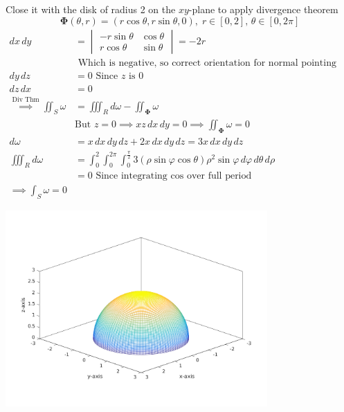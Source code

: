 \documentclass{article}
\begin{document}
\begin{enumerate}
\begin{enumerate}
        Close it with the disk of radius 2 on the $xy$-plane to apply divergence 
        theorem
        \[ \boldsymbol \Phi(\theta, r) = 
        (r \cos \theta, r \sin \theta, 0),\; 
        r \in [0,2],\, \theta \in [0, 2\pi] \]
        \begin{align*}
            dx\, dy &= 
            \begin{vmatrix} -r\sin \theta & \cos \theta \\ 
                             r \cos \theta &  \sin \theta 
            \end{vmatrix} = -2r \\
            &\text{ Which is negative, 
            so correct orientation for normal pointing down.} \\
            dy\, dz &= 0 \text{ Since $z$ is 0} \\
            dz\, dx &= 0 \\
            \overset{\text{Div Thm}}{\implies} \iint_S \omega &= 
            \iiint_R d\omega - \iint_{\boldsymbol \Phi} \omega \\
            &\text{But } z = 0 \implies xz \, dx \, dy = 0 
            \implies \iint_{\boldsymbol \Phi} \omega = 0 \\
            d\omega &= x \, dx \, dy \, dz + 2x \, dx \, dy \, dz 
            = 3x \, dx \, dy \, dz \\
            \iiint_R d\omega &= \int_0^{2} \int_0^{2\pi} \int_0^{\frac{\pi}{2}}
            3(\rho \sin \varphi \cos \theta) \rho^2 \sin \varphi 
            \, d\varphi \, d\theta \, d\rho \\
            &= 0 \text{ Since integrating cos over full period} \\
            \implies \int_S \omega = 0
        \end{align*}

        \includegraphics[width=0.75\textwidth,center]{b42-a10-5a}


\end{enumerate}
\end{enumerate}
\end{document}
